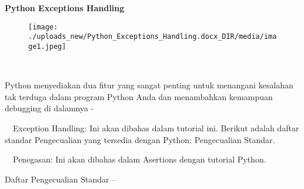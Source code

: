 \documentclass[a4paper,12pt]{report}
\begin{document}
\sloppy
\begin{center}{\fontsize{24pt}{24pt}\selectfont \textbf{Python Exceptions Handling} 



\begin{figure}[H]
\begin{center}
\texttt{[image: ./uploads\_new/Python\_Exceptions\_Handling.docx\_DIR/media/image1.jpeg]}
\end{center}
\end{figure}




 \\}\end{center} \par
\noindent 
Python menyediakan dua fitur yang sangat penting untuk menangani kesalahan tak terduga dalam program Python Anda dan menambahkan kemampuan debugging di dalamnya - \par
\noindent 
\vspace{12pt}
\noindent 
 $  $ $  $ $  $ $  $Exception Handling: Ini akan dibahas dalam tutorial ini. Berikut adalah daftar standar Pengecualian yang tersedia dengan Python: Pengecualian Standar. \par
\noindent 
\vspace{12pt}
\noindent 
 $  $ $  $ $  $ $  $Penegasan: Ini akan dibahas dalam Asertions dengan tutorial Python. \par
\noindent 
\vspace{12pt}
\noindent 
Daftar Pengecualian Standar – \par
\noindent 
\vspace{12pt}


\end{document}
